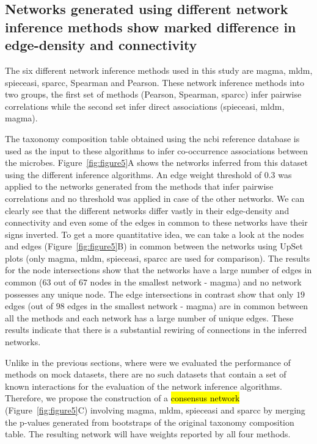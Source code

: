   \FloatBarrier

  \subsection*{Networks generated using different network inference methods show marked difference in edge-density and connectivity}

  The six different network inference methods used in this study are \ac{magma}, \ac{mldm}, \ac{spieceasi}, \ac{sparcc}, Spearman and Pearson.
  These network inference methods into two groups, the first set of methods (Pearson, Spearman, \ac{sparcc}) infer pairwise correlations while the second set infer direct associations (\ac{spieceasi}, \ac{mldm}, \ac{magma}).

  The taxonomy composition table obtained using the \ac{ncbi} reference database is used as the input to these algorithms to infer co-occurrence associations between the microbes.
  Figure~\ref{fig:figure5}A shows the networks inferred from this dataset using the different inference algorithms.
  An edge weight threshold of 0.3 was applied to the networks generated from the methods that infer pairwise correlations and no threshold was applied in case of the other networks.
  We can clearly see that the different networks differ vastly in their edge-density and connectivity and even some of the edges in common to these networks have their signs inverted.
  To get a more quantitative idea, we can take a look at the nodes and edges (Figure~\ref{fig:figure5}B) in common between the networks using UpSet plots (only \ac{magma}, \ac{mldm}, \ac{spieceasi}, \ac{sparcc} are used for comparison).
  The results for the node intersections show that the networks have a large number of edges in common ($63$ out of $67$ nodes in the smallest network - \ac{magma}) and no network possesses any unique node.
  The edge intersections in contrast show that only $19$ edges (out of $98$ edges in the smallest network - \ac{magma}) are in common between all the methods and each network has a large number of unique edges.
  These results indicate that there is a substantial rewiring of connections in the inferred networks.

  Unlike in the previous sections, where were we evaluated the performance of methods on mock datasets, there are no such datasets that contain a set of known interactions for the evaluation of the network inference algorithms.
  Therefore, we propose the construction of a \hl{consensus network} (Figure~\ref{fig:figure5}C) involving \ac{magma}, \ac{mldm}, \ac{spieceasi} and \ac{sparcc} by merging the p-values generated from bootstraps of the original taxonomy composition table.
  The resulting network will have weights reported by all four methods.

